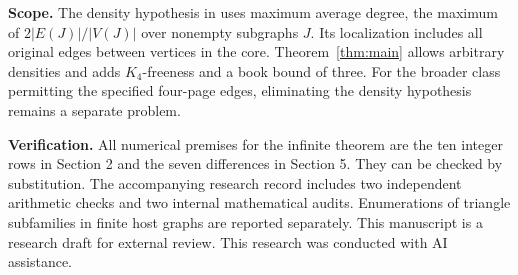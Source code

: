\documentclass[11pt,a4paper]{article}
\newcommand{\smalltitle}[1]{\par\medskip\noindent\textbf{#1}\enspace}
\begin{document}
\smalltitle{Scope.}
The density hypothesis in \cite{tsu} uses maximum average degree, the
maximum of \(2|E(J)|/|V(J)|\) over nonempty subgraphs \(J\). Its localization
includes all original edges between vertices in the core. Theorem~\ref{thm:main}
allows arbitrary densities and adds \(K_4\)-freeness and a book bound of three.
For the broader class permitting the specified four-page edges, eliminating
the density hypothesis remains a separate problem.

\smalltitle{Verification.}
All numerical premises for the infinite theorem are the ten integer rows
in Section 2 and the seven differences in Section 5. They can be checked by
substitution. The accompanying research record includes two independent
arithmetic checks and two internal mathematical audits.
Enumerations of triangle subfamilies in finite host graphs are reported
separately. This manuscript is a research draft for external review.
This research was conducted with AI assistance.
\end{document}
